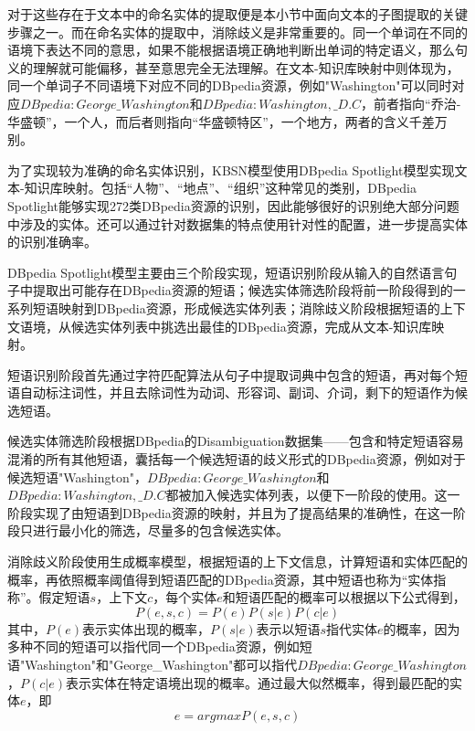 对于这些存在于文本中的命名实体的提取便是本小节中面向文本的子图提取的关键步骤之一。而在命名实体的提取中，消除歧义是非常重要的。同一个单词在不同的语境下表达不同的意思，如果不能根据语境正确地判断出单词的特定语义，那么句义的理解就可能偏移，甚至意思完全无法理解。在文本-知识库映射中则体现为，同一个单词子不同语境下对应不同的DBpedia资源，例如"Washington"可以同时对应$DBpedia:George\_Washington$和$DBpedia:Washington,\_D.C$，前者指向“乔治-华盛顿”，一个人，而后者则指向“华盛顿特区”，一个地方，两者的含义千差万别。

为了实现较为准确的命名实体识别，KBSN模型使用DBpedia Spotlight模型实现文本-知识库映射。包括“人物”、“地点”、“组织”这种常见的类别，DBpedia Spotlight能够实现272类DBpedia资源的识别，因此能够很好的识别绝大部分问题中涉及的实体。还可以通过针对数据集的特点使用针对性的配置，进一步提高实体的识别准确率。

DBpedia Spotlight模型主要由三个阶段实现，短语识别阶段从输入的自然语言句子中提取出可能存在DBpedia资源的短语；候选实体筛选阶段将前一阶段得到的一系列短语映射到DBpedia资源，形成候选实体列表；消除歧义阶段根据短语的上下文语境，从候选实体列表中挑选出最佳的DBpedia资源，完成从文本-知识库映射。

短语识别阶段首先通过字符匹配算法从句子中提取词典中包含的短语，再对每个短语自动标注词性，并且去除词性为动词、形容词、副词、介词，剩下的短语作为候选短语。

候选实体筛选阶段根据DBpedia的Disambiguation数据集——包含和特定短语容易混淆的所有其他短语，囊括每一个候选短语的歧义形式的DBpedia资源，例如对于候选短语"Washington"，$DBpedia:George\_Washington$和$DBpedia:Washington,\_D.C$都被加入候选实体列表，以便下一阶段的使用。这一阶段实现了由短语到DBpedia资源的映射，并且为了提高结果的准确性，在这一阶段只进行最小化的筛选，尽量多的包含候选实体。

消除歧义阶段使用生成概率模型，根据短语的上下文信息，计算短语和实体匹配的概率，再依照概率阈值得到短语匹配的DBpedia资源，其中短语也称为“实体指称”。假定短语$s$，上下文$c$，每个实体$e$和短语匹配的概率可以根据以下公式得到，
\begin{equation}
P(e,s,c) = P(e)P(s|e)P(c|e)
\end{equation}
其中，$P(e)$表示实体出现的概率，$P(s|e)$表示以短语$s$指代实体$e$的概率，因为多种不同的短语可以指代同一个DBpedia资源，例如短语"Washington"和"George\_Washington"都可以指代$DBpedia:George\_Washington$，$P(c|e)$表示实体在特定语境出现的概率。通过最大似然概率，得到最匹配的实体$e$，即
\begin{equation}
e = argmaxP(e,s,c)
\end{equation}

